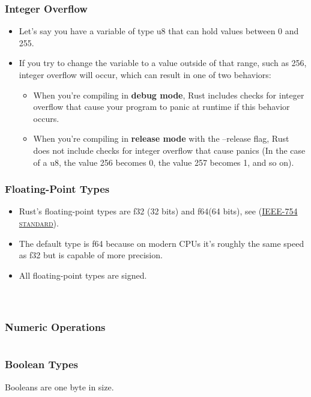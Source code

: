 \documentclass{beamer}
\begin{document}
	\begin{frame}[fragile]
		\frametitle{Integer Overflow}
		\begin{itemize}
			\item Let’s say you have a variable of type u8 that can hold values between 0 and 255. 
			\item 		If you try to change the variable to a value outside of that range, such as 256, integer overflow will occur, which can result in one of two behaviors:
			\begin{itemize}
				\item When you’re compiling in \textbf{debug mode}, Rust includes checks for integer overflow that cause your program to panic at runtime if this behavior occurs.
				\item 		When you’re compiling in \textbf{release mode} with the --release flag, Rust does not include checks for integer overflow that cause panics (In the case of a u8, the value 256 becomes 0, the value 257 becomes 1, and so on).
			\end{itemize}
		\end{itemize}
	\end{frame}
	
	\begin{frame}[fragile]
		\frametitle{Floating-Point Types}
		\begin{itemize}
			
			\item Rust’s floating-point types are f32 (32 bits) and f64(64 bits), see (\href{https://en.wikipedia.org/wiki/IEEE_754}{\textsc{IEEE-754 standard}}).
			
			\item The default type is f64 because on modern CPUs it’s roughly the same speed as f32 but is capable of more precision. 
			\item All floating-point types are signed.
		\end{itemize}
		\begin{columns}
			\inputminted{rust}{./code/floating-types.rs}
			\inputminted{rust}{./code/IEEE-754.rs}
		\end{columns}
	\end{frame}
	
	\begin{frame}[fragile]
		\frametitle{Numeric Operations}
		\inputminted{rust}{./code/numeric-operations.rs}
	\end{frame}
	
	\begin{frame}[fragile]
		\frametitle{Boolean Types}
		Booleans are one byte in size.
		
		\inputminted{rust}{./code/bool-types.rs}
	\end{frame}
	
\end{document}
